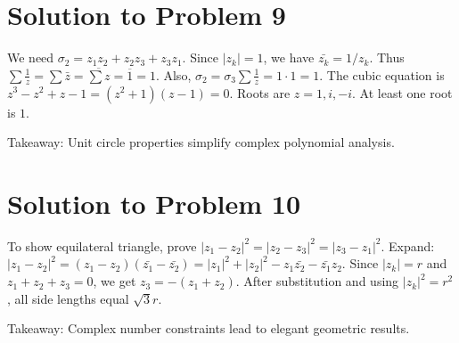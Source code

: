 \section*{Solution to Problem 9}
We need $\sigma_2 = z_1z_2 + z_2z_3 + z_3z_1$. Since $|z_k| = 1$, we have $\bar{z_k} = 1/z_k$.
Thus $\sum \frac{1}{z} = \sum \bar{z} = \overline{\sum z} = \overline{1} = 1$.
Also, $\sigma_2 = \sigma_3 \sum \frac{1}{z} = 1 \cdot 1 = 1$.
The cubic equation is $z^3 - z^2 + z - 1 = (z^2 + 1)(z - 1) = 0$.
Roots are $z = 1, i, -i$. At least one root is $1$.

Takeaway: Unit circle properties simplify complex polynomial analysis.

\section*{Solution to Problem 10}
To show equilateral triangle, prove $|z_1-z_2|^2 = |z_2-z_3|^2 = |z_3-z_1|^2$.
Expand: $|z_1-z_2|^2 = (z_1-z_2)(\bar{z_1}-\bar{z_2}) = |z_1|^2 + |z_2|^2 - z_1\bar{z_2} - \bar{z_1}z_2$.
Since $|z_k| = r$ and $z_1 + z_2 + z_3 = 0$, we get $z_3 = -(z_1 + z_2)$.
After substitution and using $|z_k|^2 = r^2$, all side lengths equal $\sqrt{3}r$.

Takeaway: Complex number constraints lead to elegant geometric results.
